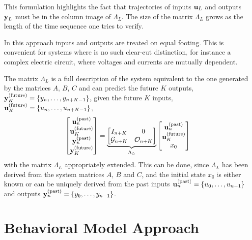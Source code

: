 This formulation highlights the fact that trajectories of inputs $\boldsymbol{\mathrm{u}}_L$ and outputs $\boldsymbol{\mathrm{y}}_L$ must be in the column image of $\Lambda_L$. The size of the matrix $\Lambda_L$ grows as the length of the time sequence one tries to verify.

In this approach inputs and outputs are treated on equal footing. This is convenient for systems where is no such clear-cut distinction, for instance a complex electric circuit, where voltages and currents are mutually dependent.

The matrix $\Lambda_L$ is a full description of the system equivalent to the one generated by the matrices $A$, $B$, $C$ and can predict the future $K$ outputs, $\boldsymbol{\mathrm{y}}_K^{(\textrm{future})} = \{y_n,\ldots,y_{n+K-1}\}$, given the future $K$ inputs, $\boldsymbol{\mathrm{u}}_K^{(\textrm{future})} = \{u_n,\ldots,u_{n+K-1}\}$,
\begin{equation*}
  \begin{bmatrix}
    \boldsymbol{\mathrm{u}}_n^{(\textrm{past})} \\ \boldsymbol{\mathrm{u}}_K^{(\textrm{future})} \\ \boldsymbol{\mathrm{y}}_n^{(\textrm{past})} \\ \boldsymbol{\mathrm{y}}_K^{(\textrm{future})}
  \end{bmatrix} = \underbrace{
  \begin{bmatrix}
    I_{n+K} & 0 \\ \mathcal{G}_{n+K} & \mathcal{O}_{n+K}
  \end{bmatrix}}_{\Lambda_L}
  \begin{bmatrix}
    \boldsymbol{\mathrm{u}}_n^{(\textrm{past})} \\ \boldsymbol{\mathrm{u}}_K^{(\textrm{future})} \\ x_0
  \end{bmatrix}
\end{equation*}
with the matrix $\Lambda_L$ appropriately extended. This can be done, since $\Lambda_L$ has been derived from the system matrices $A$, $B$ and $C$, and the initial state $x_0$ is either known or can be uniquely derived from the past inputs $\boldsymbol{\mathrm{u}}_n^{(\textrm{past})} = \{u_0,\ldots,u_{n-1}\}$ and outputs $\boldsymbol{\mathrm{y}}_n^{(\textrm{past})} = \{y_0,\ldots,y_{n-1}\}$.

\section{Behavioral Model Approach}
\label{sec:behavioral-model-approach}

